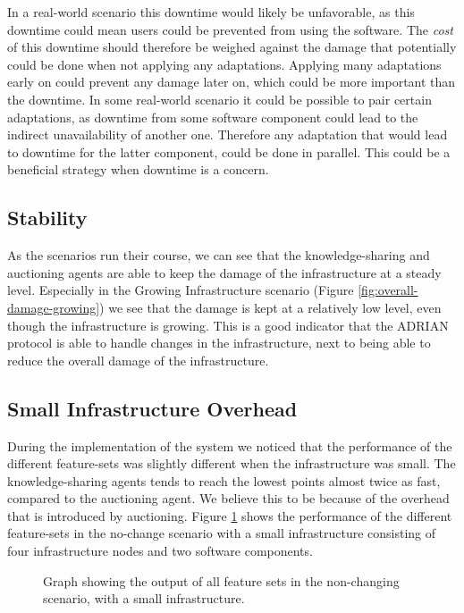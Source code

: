 In a real-world scenario this downtime would likely be unfavorable, as this downtime could mean users could be prevented from using the software. The \emph{cost} of this downtime should therefore be weighed against the damage that potentially could be done when not applying any adaptations. Applying many adaptations early on could prevent any damage later on, which could be more important than the downtime. 
In some real-world scenario it could be possible to pair certain adaptations, as downtime from some software component could lead to the indirect unavailability of another one. Therefore any adaptation that would lead to downtime for the latter component, could be done in parallel. This could be a beneficial strategy when downtime is a concern.

\subsection{Stability}
\label{ssec:stability}
As the scenarios run their course, we can see that the knowledge-sharing and auctioning agents are able to keep the damage of the infrastructure at a steady level. Especially in the Growing Infrastructure scenario (Figure \ref{fig:overall-damage-growing}) we see that the damage is kept at a relatively low level, even though the infrastructure is growing. This is a good indicator that the ADRIAN protocol is able to handle changes in the infrastructure, next to being able to reduce the overall damage of the infrastructure.

\subsection{Small Infrastructure Overhead}
During the implementation of the system we noticed that the performance of the different feature-sets was slightly different when the infrastructure was small. The knowledge-sharing agents tends to reach the lowest points almost twice as fast, compared to the auctioning agent. We believe this to be because of the overhead that is introduced by auctioning. Figure \ref{fig:small-infra-no-change} shows the performance of the different feature-sets in the no-change scenario with a small infrastructure consisting of four infrastructure nodes and two software components.

\begin{figure}[H]
    \centering
        
    \caption{Graph showing the output of all feature sets in the non-changing scenario, with a small infrastructure.}
    \label{fig:small-infra-no-change}
\end{figure}

